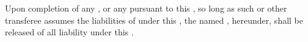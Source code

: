 Upon completion of any \permittedTransfer, or any \consentTransfer pursuant to this \lease, so long as such \permittedTransfer or other transferee assumes the liabilities of \lessee under this \lease, the named \lessee, hereunder, shall be released of all liability under this \lease.

